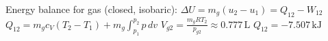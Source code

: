 Energy balance for gas (closed, isobaric):  
\( \Delta U = m_g (u_2 - u_1) = Q_{12} - W_{12} \)  
\( Q_{12} = m_g c_V (T_2 - T_1) + m_g \int_{p_1}^{p_2} p \, dv \)  
\( V_{g2} = \frac{m_g R T_2}{p_{g2}} \approx 0.777 \, \text{L} \)  
\( Q_{12} = -7.507 \, \text{kJ} \)